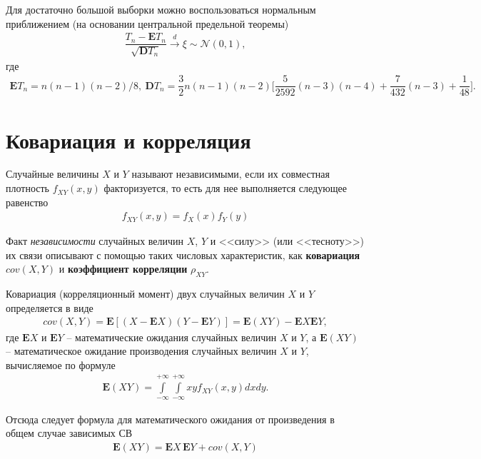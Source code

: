 \documentclass[%
	11pt,
	a4paper,
	utf8,
		]{article}
\begin{document}
Для достаточно большой выборки можно воспользоваться нормальным приближением (на основании центральной предельной теоремы)
\begin{align*}
	\dfrac{ T_n - \mathbf{E}T_n }{ \sqrt{\mathbf{D}T_n} } \xrightarrow{d} \xi \sim \mathcal{N}(0, 1),
\end{align*}
где
\begin{align*}
	\mathbf{E} T_n = n(n-1)(n-2)/8, \ 
	\mathbf{D} T_n = \dfrac{3}{2}n(n-1)(n-2)\Bigg[ \dfrac{5}{2592}(n - 3)(n - 4) + \dfrac{7}{432}(n - 3) + \dfrac{1}{48} \Bigg].
\end{align*}

\section{Ковариация и корреляция}

Случайные величины $ X $ и $ Y $ называют независимыми, если их совместная плотность $ f_{XY}(x, y) $ факторизуется, то есть для нее выполняется следующее равенство \cite[]{shulenin:param}
\begin{align*}
	f_{XY}(x, y) = f_X(x) f_Y(y)
\end{align*}

Факт \emph{независимости} случайных величин $ X $, $ Y $  и <<силу>> (или <<тесноту>>) их связи описывают с помощью таких числовых характеристик, как \textbf{ковариация} $ cov(X, Y) $ и \textbf{коэффициент корреляции} $ \rho_{XY} $.

Ковариация (корреляционный момент) двух случайных величин $ X $ и $ Y $ определяется в виде
\begin{align*}
	cov(X, Y) = \mathbf{E}[ (X - \mathbf{E}X)( Y - \mathbf{E}Y) ] = \mathbf{E}(XY) - \mathbf{E}X \mathbf{E}Y,
\end{align*}
где $ \mathbf{E}X $ и $ \mathbf{E}Y $ -- математические ожидания случайных величин $ X $ и $ Y $, а $ \mathbf{E}(XY) $ -- математическое ожидание производения случайных величин $ X $ и $ Y $, вычисляемое по формуле
\begin{align*}
	\mathbf{E}(XY)  = \int\limits_{-\infty}^{+\infty} \int\limits_{-\infty}^{+\infty} xy f_{XY}(x, y) dx dy.
\end{align*}

Отсюда следует формула для математического ожидания от произведения в общем случае зависимых СВ
\begin{align*}
	 \mathbf{E}(XY) = \mathbf{E}X \, \mathbf{E}Y + cov(X, Y)
\end{align*}
\end{document}
